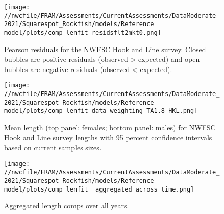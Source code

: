 \documentclass[11pt,
  english,
  a4paper,
]{article}
\begin{document}
\tagmcend\tagstructend


\begin{figure}
\centering
\texttt{[image: //nwcfile/FRAM/Assessments/CurrentAssessments/DataModerate\_2021/Squarespot\_Rockfish/models/Reference model/plots/comp\_lenfit\_residsflt2mkt0.png]}
\caption{Pearson residuals for the NWFSC Hook and Line survey. Closed bubbles are positive residuals (observed \textgreater{} expected) and open bubbles are negative residuals (observed \textless{} expected).\label{fig:hkl-pearson}}
\end{figure}

\tagmcend\tagstructend


\begin{figure}
\centering
\texttt{[image: //nwcfile/FRAM/Assessments/CurrentAssessments/DataModerate\_2021/Squarespot\_Rockfish/models/Reference model/plots/comp\_lenfit\_data\_weighting\_TA1.8\_HKL.png]}
\caption{Mean length (top panel: females; bottom panel: males) for NWFSC Hook and Line survey lengths with 95 percent confidence intervals based on current samples sizes.\label{fig:hkl-mean-len-fit}}
\end{figure}

\tagmcend\tagstructend


\begin{figure}
\centering
\texttt{[image: //nwcfile/FRAM/Assessments/CurrentAssessments/DataModerate\_2021/Squarespot\_Rockfish/models/Reference model/plots/comp\_lenfit\_\_aggregated\_across\_time.png]}
\caption{Aggregated length comps over all years.\label{fig:agg-len-fit}}
\end{figure}

\tagmcend\tagstructend

\end{document}
